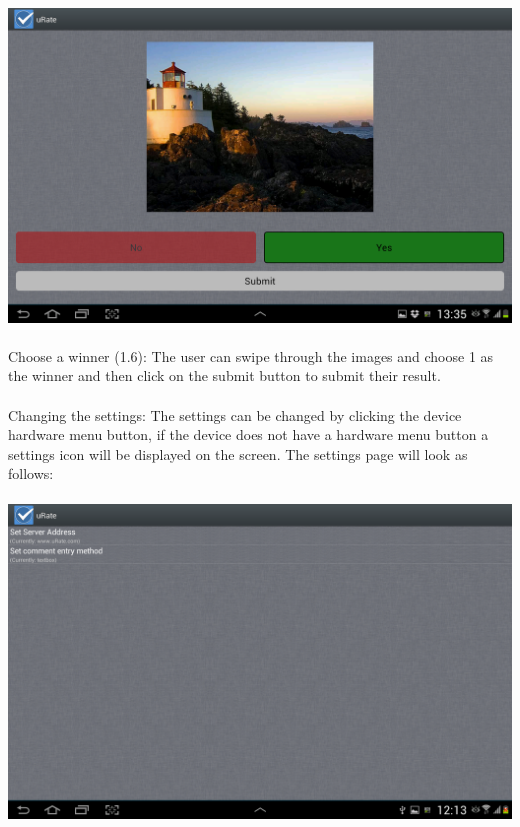 \documentclass[10pt,a4paper]{article}
\begin{document}
\paragraph{}
\includegraphics[scale=0.3]{Pictures/YesNo.png}
\paragraph{}
Choose a winner (1.6):
The user can swipe through the images and choose 1 as the winner and then click on the submit button to submit their result.
\paragraph{}
Changing the settings:
The settings can be changed by clicking the device hardware menu button, if the device does not have a hardware menu button a settings icon will be displayed on the screen. The settings page will look as follows:
\paragraph{}
\advance\leftskip-1.3cm
\includegraphics[scale=0.3]{Pictures/Settings.png}
\end{document}
